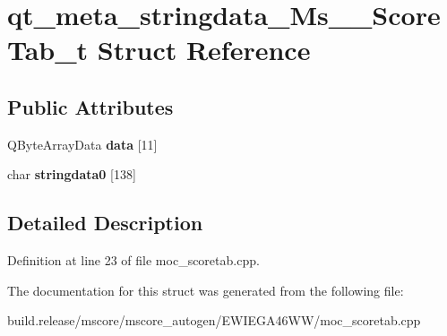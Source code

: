 \hypertarget{structqt__meta__stringdata___ms_____score_tab__t}{}\section{qt\+\_\+meta\+\_\+stringdata\+\_\+\+Ms\+\_\+\+\_\+\+Score\+Tab\+\_\+t Struct Reference}
\label{structqt__meta__stringdata___ms_____score_tab__t}
\subsection*{Public Attributes}
\begin{DoxyCompactItemize}
\item 
\mbox{\label{structqt__meta__stringdata___ms_____score_tab__t_ad5e0b9fd4e3a428ad8973d50cd655fea}} 
Q\+Byte\+Array\+Data {\bfseries data} \mbox{[}11\mbox{]}
\item 
\mbox{\label{structqt__meta__stringdata___ms_____score_tab__t_a19f89dcede6781d42afef0ec0b62a537}} 
char {\bfseries stringdata0} \mbox{[}138\mbox{]}
\end{DoxyCompactItemize}


\subsection{Detailed Description}


Definition at line 23 of file moc\+\_\+scoretab.\+cpp.



The documentation for this struct was generated from the following file\+:\begin{DoxyCompactItemize}
\item 
build.\+release/mscore/mscore\+\_\+autogen/\+E\+W\+I\+E\+G\+A46\+W\+W/moc\+\_\+scoretab.\+cpp\end{DoxyCompactItemize}
